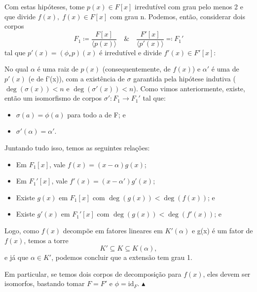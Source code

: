 \documentclass[../algebraIII_notes.tex]{subfiles}
\begin{document}
\begin{proof*}
	Com estas hipóteses, tome \(p(x)\in F[x]\) irredutível com grau pelo menos 2 e que divide \(f(x),\; f(x)\in F[x]\) com grau n. Podemos, então, considerar dois corpos
	\[
		F_{1}\coloneqq \frac{F[x]}{\langle p(x) \rangle} \quad\&\quad \frac{F'[x]}{\langle p'(x) \rangle} \eqqcolon F_{1}'
	\]
	tal que \(p'(x)=(\phi_{*}p)(x)\) é irredutível e divide \(f'(x)\in F'[x]\):
	\begin{center}
	\end{center}
	No qual \( \alpha \) é uma raiz de \(p(x)\) (consequentemente, de \(f(x)\)) e \(\alpha '\) é uma de \(p'(x)\) (e de f'(x)), com a existência de \(\sigma \) garantida pela hipótese indutiva (\(\deg{(\sigma (x))} < n\) e \(\deg{(\sigma'(x))} < n\)). Como vimos anteriormente, existe, então um isomorfismo de corpos \(\sigma':F_{1}\rightarrow F_{1}'\) tal que:
	\begin{itemize}
		\item[1)] \(\sigma (a)=\phi(a)\) para todo a de F; e
		\item[2)] \(\sigma '(\alpha )=\alpha '\).
	\end{itemize}
	Juntando tudo isso, temos as seguintes relações:
	\begin{itemize}
		\item Em \(F_{1}[x]\), vale \(f(x)=(x-\alpha )g(x)\);
		\item Em \(F_{1}'[x]\), vale \(f'(x)=(x-\alpha')g'(x)\);
		\item Existe \(g(x)\) em \(F_{1}[x]\) com \(\deg{(g(x))}<\deg{(f(x))}\); e
		\item Existe \(g'(x)\) em \(F_{1}'[x]\) com \(\deg{(g(x))}<\deg{(f'(x))}\); e
	\end{itemize}
	Logo, como \(f(x)\) decompõe em fatores lineares em \(K'(\alpha )\) e g(x) é um fator de \(f(x)\), temos a torre
	\[
		K' \subseteq K \subseteq K(\alpha ),
	\]
	e já que \(\alpha \in K'\), podemos concluir que a extensão tem grau 1.

	Em particular, se temos dois corpos de decomposição para \(f(x)\), eles devem ser isomorfos, bastando tomar \(F=F'\) e \(\phi = \mathrm{id}_{F}.\) \(\blacktriangle\) \qedsymbol
\end{proof*}
\end{document}
